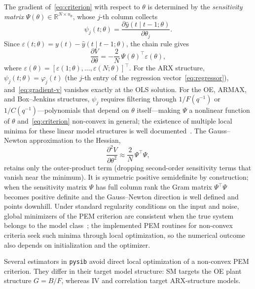 \documentclass[acmsmall,screen,review]{acmart}
\begin{document}
The gradient of~\eqref{eq:criterion} with respect to $\theta$ is
determined by the \emph{sensitivity matrix}
$\Psi(\theta) \in \mathbb{R}^{N \times n_\theta}$, whose $j$-th column collects
\begin{equation}
  \psi_j(t;\theta) = \frac{\partial\hat{y}(t \mid t-1;\theta)}{\partial\theta_j}.
  \label{eq:sensitivity}
\end{equation}
Since $\varepsilon(t;\theta) = y(t) - \hat{y}(t \mid t-1;\theta)$, the chain rule gives
\begin{equation}
  \frac{\partial V}{\partial\theta} = -\frac{2}{N}\,\Psi(\theta)^\top\varepsilon(\theta),
  \label{eq:gradient-v}
\end{equation}
where $\varepsilon(\theta) = [\varepsilon(1;\theta),\ldots,\varepsilon(N;\theta)]^\top$.
For the ARX structure, $\psi_j(t;\theta) = \varphi_j(t)$ (the $j$-th entry of
the regression vector~\eqref{eq:regressor}), and~\eqref{eq:gradient-v} vanishes
exactly at the OLS solution.  For the OE, ARMAX, and Box--Jenkins structures, $\psi_j$
requires filtering through $1/F(q^{-1})$ or $1/C(q^{-1})$---polynomials
that depend on $\theta$ itself---making $\Psi$ a nonlinear function of
$\theta$ and~\eqref{eq:criterion} non-convex in general; the existence
of multiple local minima for these linear model structures is well
documented~\cite{astrom1974,soderstrom1982,eckhard2011global,eckhard2012pem}.  The
Gauss--Newton approximation to the Hessian,
\begin{equation}
  \frac{\partial^2 V}{\partial\theta^2} \approx \frac{2}{N}\,\Psi^\top\Psi,
  \label{eq:gn-hessian-fw}
\end{equation}
retains only the outer-product term (dropping second-order sensitivity
terms that vanish near the minimum).  It is symmetric positive semidefinite
by construction; when the sensitivity matrix $\Psi$ has full column rank
the Gram matrix $\Psi^\top\Psi$ becomes positive definite and the
Gauss--Newton direction is well defined and points downhill.
Under standard regularity conditions on the input and noise,
global minimizers of the PEM criterion are consistent when the
true system belongs to the model class~\cite{ljung1978,ljung1999};
the implemented PEM routines for non-convex criteria seek such minima through
local optimization, so the numerical outcome also depends on
initialization and the optimizer.

Several estimators in \texttt{pysib} avoid direct local optimization of a
non-convex PEM criterion.  They differ in their target model structure: SM
targets the OE plant structure \(G = B/F\), whereas IV and correlation target
ARX-structure models.
\end{document}
